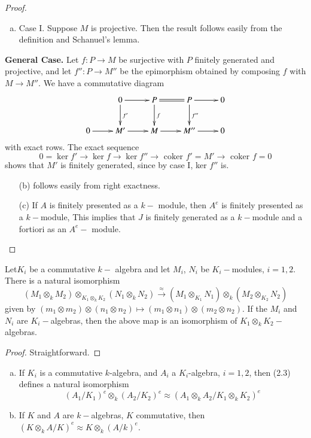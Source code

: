 \begin{proof}
\begin{enumerate}[(a)]
\item Case I. Suppose $M$ is projective. Then the result follows
  easily from the definition and Schanuel's lemma. 
\end{enumerate}

\medskip
\noindent
\textbf{General Case.} Let $f : P \to M$ be surjective with $P$
finitely generated and projective, and let $f'' : P \to M''$ be the
epimorphism obtained by composing $f$ with $M \to M''$. We have a
commutative diagram 
\[
\xymatrix{
& 0 \ar[r] \ar[d]^{f'} & P \ar[d]^f \ar@{=}[r] & P \ar[r] \ar[d]^{f''}
  & 0 \\
0 \ar[r] & M' \ar[r] & M \ar[r] & M'' \ar[r] & 0
}
\]
with exact rows. The exact sequence
$$
0 = \ker f' \to \ker f \to \ker f'' \to \text{ coker } f' = M' \to \text{ 
  coker } f = 0 
$$
shows that  $M'$ is finitely generated, since by case I, ker $f''$ is.
\begin{enumerate}
\item[(b)] follows easily from right exactness.

\item[(c)] If $A$ is finitely presented as a $k-$ module, then $A^e$
  is finitely presented as a $k-$module, This implies that $J$ is
  finitely generated as a $k-$module and a fortiori as an $A^e-$
  module.	 
\end{enumerate}
\end{proof}

\setcounter{lemma}{2}
\begin{lemma}%
Let\pageoriginale $K_i$ be a commutative $k-$ algebra and let $M_i$,
$N_i$ be \break $K_i -$modules, $i = 1, 2$. There is a natural isomorphism  
$$
(M_1 \otimes_k M_2) \otimes_{K_1 \otimes_k K_2} (N_1 \otimes_k N_2) 
\xrightarrow{\approx} (M_1 \otimes_{K_1} N_1) \otimes_k (M_2
\otimes_{K_2} N_2) 
$$
given by $(m_1 \otimes m_2) \otimes (n_1 \otimes n_2) \mapsto (m_1
\otimes n_1) \otimes (m_2 \otimes n_2)$. If the $M_i$ and $N_i$ are
$K_i-$algebras, then the above map is an isomorphism of $K_1 \otimes_k
K_2 -$algebras. 
\end{lemma}

\begin{proof}
Straightforward.
\end{proof}

\setcounter{coro}{3}
\begin{coro}\label{chap3:coro2.4} %
\begin{enumerate}[(a)]
\item If $K_i$ is a commutative $k$-algebra, and $A_i$ a $K_i$-alge\-bra,
  $i = 1, 2$, then (2.3) defines a natural isomorphism  
$$
(A_1/K_1)^e \otimes_k (A_2 /K_2)^e \approx (A_1 \otimes_k A_2 /K_1
  \otimes_k K_2)^e 
$$ 

\item If $K$ and $A$ are $k-$algebras, $K$ commutative, then $(K
  \otimes_k A/K)^e \approx K \otimes_k (A/k)^e$. 
\end{enumerate}
\end{coro}

